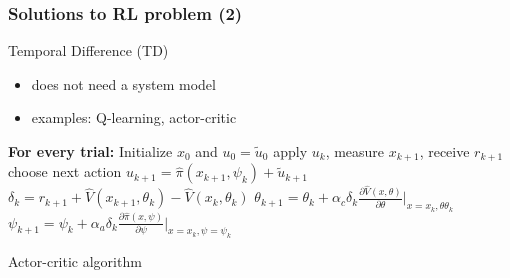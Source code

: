 \documentclass{beamer}
\begin{document}
			
	\begin{frame}\frametitle{Solutions to RL problem (2)}
		\vspace{3mm}
		\fontsize{8}{4}\selectfont
		Temporal Difference (TD)
		\begin{itemize}		 	
			\item does not need a system model \pause
			\item examples: Q-learning, actor-critic \pause			
		\end{itemize}
		\pause
		\begin{algorithm}[H]
			\begin{algorithmic}[1]    			
				\fontsize{8}{4}\selectfont 
				\STATE \textbf{For every trial:}
				\STATE  Initialize $x_0$ and $u_0 = \tilde{u}_0$
				\REPEAT
				\STATE apply $u_k$, measure $x_{k+1}$, receive $r_{k+1}$ 
				\STATE choose next action $ u_{k+1} = \hat{\pi}(x_{k+1}, \psi_k) + \tilde{u}_{k+1} $ 
				\STATE $ \delta_k = r_{k+1} + \hat{V}(x_{k+1}, \theta_k) - \hat{V}(x_{k}, \theta_k) $ 
				\STATE $ \theta_{k+1} = \theta_k + \alpha_c\delta_k \frac{\partial \hat{V}(x,\theta)}{\partial \theta} \bigg|_{x=x_k, \theta \theta_k}$ 
				\STATE $ \psi_{k+1} = \psi_k + \alpha_a\delta_k \frac{\partial \hat{\pi}(x,\psi)}{\partial \psi} \bigg|_{x=x_k, \psi = \psi_k}$
			\end{algorithmic}
			\caption{Actor-critic algorithm}
		\end{algorithm}
	\end{frame}	
				
\end{document}
